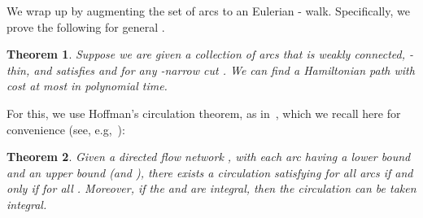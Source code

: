 \documentclass[11pt]{article}
\newtheorem{theorem}{Theorem}[section]
\theoremstyle{definition}
\begin{document}
We wrap up by augmenting the set of arcs  to an Eulerian - walk.
Specifically, we prove the following for general .
\begin{theorem}\label{thm:augment}
Suppose we are given a collection of arcs  that is weakly connected, -thin, and satisfies
 and  for any -narrow  cut .
We can find a Hamiltonian  path with cost at most
 in polynomial time.
\end{theorem}

For this, we use Hoffman's circulation theorem, as
in~\cite{AGMSS}, which we recall here for convenience (see,
e.g,~\cite[Theorem~11.2]{Schrijver-book}):
\begin{theorem}
  \label{thm:hoffman}
  Given a directed flow network , with each arc having a
  lower bound  and an upper bound  (and ), there exists a circulation  satisfying  for all arcs  if and only if
   for all .
  Moreover, if the  and  are integral, then the circulation 
  can be taken integral.
\end{theorem}
\end{document}

